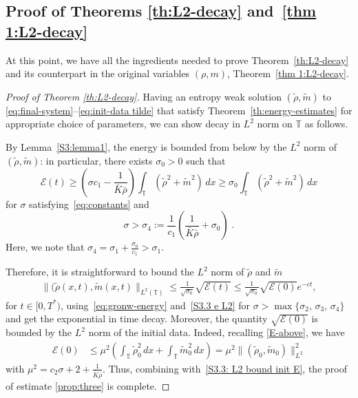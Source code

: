 \documentclass[10pt,reqno]{amsart}
\newcommand{\bbt} {\mathbb T}
\begin{document}
\subsection{Proof of Theorems \ref{th:L2-decay} and~\ref{thm 1:L2-decay}}\label{S3.3}
At this point, we have all the ingredients needed to prove Theorem~\ref{th:L2-decay} and its counterpart in the original variables $(\rho,m)$, Theorem~\ref{thm 1:L2-decay}.

\begin{proof}[Proof of Theorem \ref{th:L2-decay}]
Having an entropy weak solution $(\tilde\rho,\tilde m)$ to \eqref{eq:final-system}--\eqref{eq:init-data tilde} 
that satisfy Theorem~\ref{th:energy-estimates} for appropriate choice of parameters, we can show decay in $L^2$ norm on $\bbt$ as follows.

By Lemma~\ref{S3:lemma1}, the energy is bounded from below by the $L^2$ norm of $(\tilde\rho,\tilde m)$: in particular, there exists $\sigma_0>0$ such that
\begin{equation}\label{S3.3 e L2}
   \mathcal{E}(t)\ge \left(\sigma c_1-\frac{1}{\bar K\bar\rho}\right)\int_\bbt \left(\tilde\rho^2+\tilde m^2\right)\,dx \geq \sigma_0 \int_\bbt \left(\tilde\rho^2 +\tilde m^2\right)\,dx
\end{equation}
for $\sigma$ satisfying~\eqref{eq:constants} and
\begin{equation}\label{bound-on-sigma_4}
\sigma>\sigma_4:=\frac{1}{c_1}\left(\frac{1}{\bar K\bar\rho} + {\sigma_0}\right) \;.
\end{equation}
Here, we note  that $\sigma_4= \sigma_1 + \frac {\sigma_0} {c_1} >\sigma_1$.

Therefore, it is straightforward to bound the $L^2$ norm of $\tilde\rho$ and $\tilde m$ 
\begin{align}\label{S3.3: L2 bound init E}
\| (\tilde\rho(x,t), \tilde m(x,t)\|_{L^2(\bbt)} \leq \frac1{\sqrt{\sigma_0}}\sqrt{\mathcal{E}(t)}\le\frac1{\sqrt{\sigma_0}}
    \sqrt{\mathcal{E}(0)}e^{-ct} ,
\end{align}
for $t\in[0,T^*)$, using~\eqref{eq:gronw-energy} and~\eqref{S3.3 e L2} for $\sigma>\max\{\sigma_2,\,\sigma_3,\,\sigma_4\}$ 
and get the exponential in time decay. Moreover, the quantity $\sqrt{\mathcal{E}(0)}$ is bounded by the $L^2$ norm of the initial data. 
Indeed, recalling \eqref{E-above}, we have
\begin{align*}
    \mathcal{E}(0) &  \leq \mu^2\left( \int_\bbt \tilde\rho^2_0\,dx + \int_\bbt \tilde m^2_0\,dx\right) =\mu^2 \| (\tilde\rho_0,\tilde m_0)\|_{L^2}^2
\end{align*}
with $\mu^2=c_2\sigma + 2 + \frac{1}{\bar K\bar \rho}$. 
Thus, combining with~\eqref{S3.3: L2 bound init E}, the proof of estimate \eqref{prop:three} is complete.
\end{proof}
\end{document}

